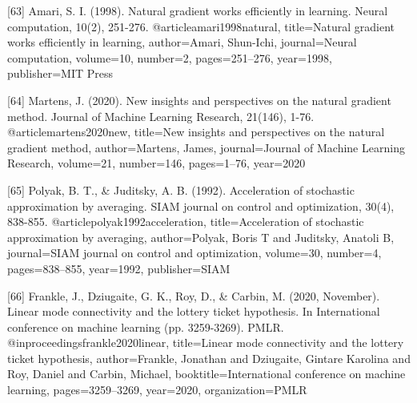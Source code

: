 \documentclass{article}
\begin{document}
{[63] Amari, S. I. (1998). Natural gradient works efficiently in learning. Neural computation, 10(2), 251-276.
@article{amari1998natural,
  title={Natural gradient works efficiently in learning},
  author={Amari, Shun-Ichi},
  journal={Neural computation},
  volume={10},
  number={2},
  pages={251--276},
  year={1998},
  publisher={MIT Press}
}

[64] Martens, J. (2020). New insights and perspectives on the natural gradient method. Journal of Machine Learning Research, 21(146), 1-76.
@article{martens2020new,
  title={New insights and perspectives on the natural gradient method},
  author={Martens, James},
  journal={Journal of Machine Learning Research},
  volume={21},
  number={146},
  pages={1--76},
  year={2020}
}

[65] Polyak, B. T., & Juditsky, A. B. (1992). Acceleration of stochastic approximation by averaging. SIAM journal on control and optimization, 30(4), 838-855.
@article{polyak1992acceleration,
  title={Acceleration of stochastic approximation by averaging},
  author={Polyak, Boris T and Juditsky, Anatoli B},
  journal={SIAM journal on control and optimization},
  volume={30},
  number={4},
  pages={838--855},
  year={1992},
  publisher={SIAM}
}

[66] Frankle, J., Dziugaite, G. K., Roy, D., & Carbin, M. (2020, November). Linear mode connectivity and the lottery ticket hypothesis. In International conference on machine learning (pp. 3259-3269). PMLR.
@inproceedings{frankle2020linear,
  title={Linear mode connectivity and the lottery ticket hypothesis},
  author={Frankle, Jonathan and Dziugaite, Gintare Karolina and Roy, Daniel and Carbin, Michael},
  booktitle={International conference on machine learning},
  pages={3259--3269},
  year={2020},
  organization={PMLR}
}



}
\end{document}
